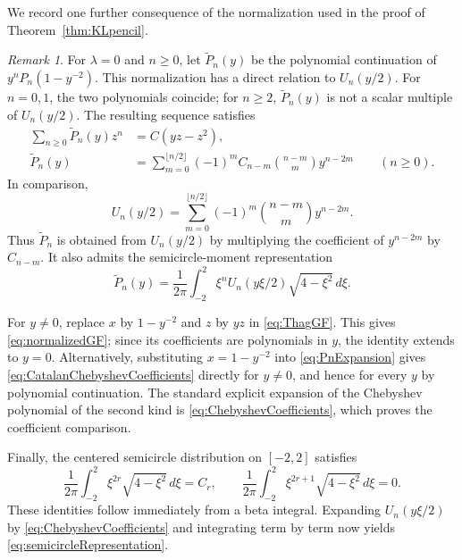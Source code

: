 \documentclass[11pt]{article}
\theoremstyle{plain}
\theoremstyle{remark}
\newtheorem{remark}[theorem]{Remark}
\begin{document}
We record one further consequence of the normalization used in the
proof of Theorem~\ref{thm:KLpencil}.

\begin{remark}\label{rem:CatalanChebyshev}
For $\lambda=0$ and $n\ge0$, let $\widetilde P_n(y)$ be the polynomial
continuation of $y^nP_n(1-y^{-2})$.  This normalization has a direct
relation to $U_n(y/2)$.  For $n=0,1$, the two polynomials coincide;
for $n\ge2$, $\widetilde P_n(y)$ is not a scalar multiple of
$U_n(y/2)$.  The resulting sequence satisfies
\begin{align}
\sum_{n\ge0}\widetilde P_n(y)z^n
&=C(yz-z^2),
\label{eq:normalizedGF}\\
\widetilde P_n(y)
&=\sum_{m=0}^{\lfloor n/2\rfloor}
(-1)^m C_{n-m}\binom{n-m}{m}y^{n-2m}
\qquad(n\ge0).
\label{eq:CatalanChebyshevCoefficients}
\end{align}
In comparison,
\begin{equation}\label{eq:ChebyshevCoefficients}
U_n(y/2)=\sum_{m=0}^{\lfloor n/2\rfloor}
(-1)^m\binom{n-m}{m}y^{n-2m}.
\end{equation}
Thus $\widetilde P_n$ is obtained from $U_n(y/2)$ by multiplying the
coefficient of $y^{n-2m}$ by $C_{n-m}$.  It also admits the
semicircle-moment representation
\begin{equation}\label{eq:semicircleRepresentation}
\widetilde P_n(y)=\frac1{2\pi}\int_{-2}^{2}
\xi^n U_n(y\xi/2)\sqrt{4-\xi^2}\,d\xi.
\end{equation}

For $y\ne0$, replace $x$ by $1-y^{-2}$ and $z$ by $yz$ in
\eqref{eq:ThagGF}.  This gives \eqref{eq:normalizedGF}; since its
coefficients are polynomials in $y$, the identity extends to $y=0$.
Alternatively, substituting $x=1-y^{-2}$ into
\eqref{eq:PnExpansion} gives \eqref{eq:CatalanChebyshevCoefficients}
directly for $y\ne0$, and hence for every $y$ by polynomial
continuation.  The standard
explicit expansion of the Chebyshev polynomial of the second kind is
\eqref{eq:ChebyshevCoefficients}, which proves the coefficient
comparison.

Finally, the centered semicircle distribution on $[-2,2]$ satisfies
\[
\frac1{2\pi}\int_{-2}^{2}\xi^{2r}\sqrt{4-\xi^2}\,d\xi=C_r,
\qquad
\frac1{2\pi}\int_{-2}^{2}\xi^{2r+1}\sqrt{4-\xi^2}\,d\xi=0.
\]
These identities follow immediately from a beta integral.  Expanding
$U_n(y\xi/2)$ by \eqref{eq:ChebyshevCoefficients} and integrating
term by term now yields \eqref{eq:semicircleRepresentation}.
\end{remark}
\end{document}
